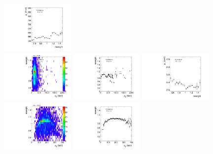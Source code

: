 \begin{figure}[htbp!]
\begin{center}
\includegraphics[angle=270, width=0.32\textwidth]{./figures/boosted/AppendixReweight/Weights/3Trk_Signal_leadHCand_Pt_m_weight_profy.pdf}\\
\includegraphics[angle=270, width=0.32\textwidth]{./figures/boosted/AppendixReweight/Weights/3Trk_Signal_leadHCand_trk0_Pt_weight.pdf}
\includegraphics[angle=270, width=0.32\textwidth]{./figures/boosted/AppendixReweight/Weights/3Trk_Signal_leadHCand_trk0_Pt_weight_profx.pdf}
\includegraphics[angle=270, width=0.32\textwidth]{./figures/boosted/AppendixReweight/Weights/3Trk_Signal_leadHCand_trk0_Pt_weight_profy.pdf}\\
\includegraphics[angle=270, width=0.32\textwidth]{./figures/boosted/AppendixReweight/Weights/3Trk_Signal_sublHCand_trk0_Pt_weight.pdf}
\includegraphics[angle=270, width=0.32\textwidth]{./figures/boosted/AppendixReweight/Weights/3Trk_Signal_sublHCand_trk0_Pt_weight_profx.pdf}

\end{center}
\end{figure}
